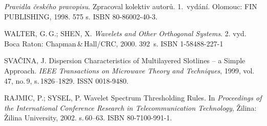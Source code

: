 \begin{literatura}{99}
    \emph{Pravidla českého pravopisu}.
    Zpracoval kolektiv autorů. 1.\ vydání.
    Olomouc: FIN PUB\-LISH\-ING, 1998. 575 s. ISBN 80-86002-40-3.

	WALTER, G.\,G.; SHEN, X.
	\emph{Wavelets and Other Orthogonal Systems}.
	2. vyd. Boca Raton: Chapman\,\&\,Hall/CRC, 2000. 392~s. ISBN 1-58488-227-1

	SVAČINA, J.
	Dispersion Characteristics of Multilayered Slotlines -- a Simple Approach.
	\emph{IEEE Transactions on Microwave Theory and Techniques},
	1999, vol.\,47, no.\,9, s.\,1826--1829. ISSN 0018-9480.

    RAJMIC, P.; SYSEL, P.
    Wavelet Spectrum Thresholding Rules.
    In \emph{Proceedings of the International Conference Research in Telecommunication Technology},
    Žilina: Žilina University, 2002. s.\,60--63. ISBN 80-7100-991-1.

\end{literatura}


%
%
%
